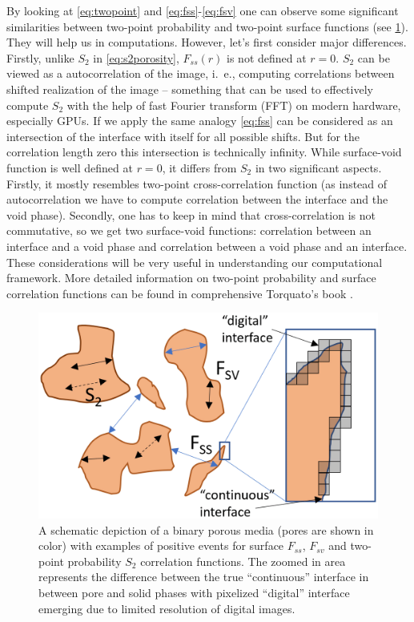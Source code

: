 \documentclass[reprint,amsmath,amssymb,aps,pre]{revtex4-1}
\begin{document}
By looking at \cref{eq:twopoint} and \cref{eq:fss}-\cref{eq:fsv} one can observe
some significant similarities between two-point probability and two-point
surface functions (see \cref{fig:scheme}). They will help us in
computations. However, let's first consider major differences. Firstly, unlike
$S_2$ in \cref{eq:s2porosity}, $F_{ss}(r)$ is not defined at $r=0$. $S_2$ can
be viewed as a autocorrelation of the image, i.~e., computing correlations
between shifted realization of the image -- something that can be used to
effectively compute $S_2$ with the help of fast Fourier transform (FFT) on
modern hardware, especially GPUs. If we apply the same analogy \cref{eq:fss}
can be considered as an intersection of the interface with itself for all
possible shifts. But for the correlation length zero this intersection is
technically infinity. While surface-void function is well defined at $r=0$, it
differs from $S_2$ in two significant aspects. Firstly, it mostly resembles
two-point cross-correlation function (as instead of autocorrelation we have to
compute correlation between the interface and the void phase). Secondly, one has
to keep in mind that cross-correlation is not commutative, so we get two
surface-void functions: correlation between an interface and a void phase and
correlation between a void phase and an interface. These considerations will be
very useful in understanding our computational framework. More detailed
information on two-point probability and surface correlation functions can be
found in comprehensive Torquato's book \cite{Torq_book}.

\begin{figure}[ht]
  \centering
  \includegraphics[width=0.9\linewidth]{images/scheme.png}
  \caption[]{A schematic depiction of a binary porous media (pores are shown in
    color) with examples of positive events for surface $F_{ss}$, $F_{sv}$ and
    two-point probability $S_2$ correlation functions. The zoomed in area
    represents the difference between the true ``continuous'' interface in
    between pore and solid phases with pixelized ``digital'' interface emerging
    due to limited resolution of digital images.}
  \label{fig:scheme}
\end{figure}
\end{document}
